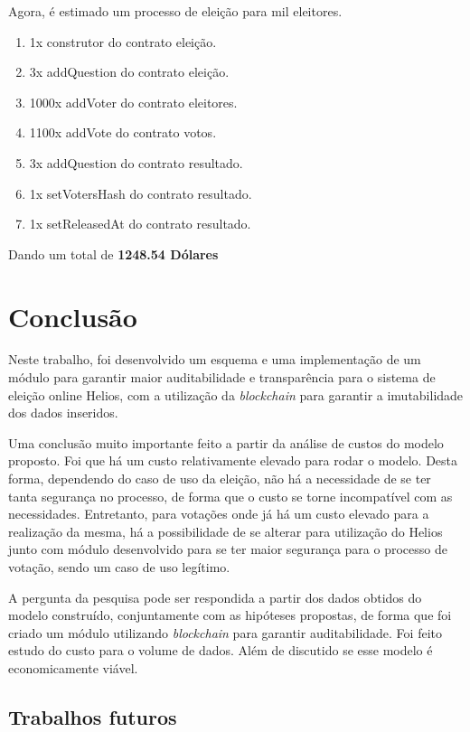 \documentclass{ufsctex/ufsctex}
\begin{document}
Agora, é estimado um processo de eleição para mil eleitores.

\begin{enumerate}
	\item 1x construtor do contrato eleição.
	\item 3x addQuestion do contrato eleição.
	\item 1000x addVoter do contrato eleitores.
	\item 1100x addVote do contrato votos.
	\item 3x addQuestion do contrato resultado.
	\item 1x setVotersHash do contrato resultado.
	\item 1x setReleasedAt do contrato resultado.
\end{enumerate}

Dando um total de \textbf{1248.54 Dólares}

\chapter{Conclusão}
Neste trabalho, foi desenvolvido um esquema e uma implementação de um módulo
para garantir maior auditabilidade e transparência para o sistema de eleição
online Helios, com a utilização da \textit{blockchain} para garantir a
imutabilidade dos dados inseridos. 

Uma conclusão muito importante feito a partir da análise de custos do modelo
proposto. Foi que há um custo relativamente elevado para rodar o modelo. Desta
forma, dependendo do caso de uso da eleição, não há a necessidade de se ter
tanta segurança no processo, de forma que o custo se torne incompatível com as
necessidades.  Entretanto, para votações onde já há um custo elevado para a
realização da mesma, há a possibilidade de se alterar para utilização do Helios
junto com módulo desenvolvido para se ter maior segurança para o processo de
votação, sendo um caso de uso legítimo.

A pergunta da pesquisa pode ser respondida a partir dos dados obtidos do modelo
construído, conjuntamente com as hipóteses propostas, de forma que foi criado
um módulo utilizando \textit{blockchain} para garantir auditabilidade. Foi feito
estudo do custo para o volume de dados. Além de discutido se esse modelo é
economicamente viável.

\section{Trabalhos futuros} 
\end{document}
